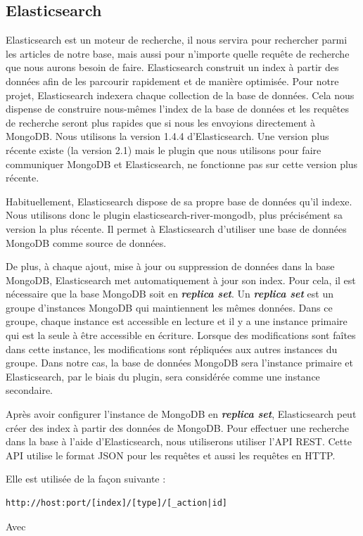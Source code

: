 \subsection{Elasticsearch}
\label{subsec:elastic}

Elasticsearch est un moteur de recherche, il nous servira pour rechercher parmi les articles de notre base, mais aussi pour n'importe quelle requête de recherche que nous aurons besoin de faire. Elasticsearch construit un index à partir des données afin de les parcourir rapidement et de manière optimisée. Pour notre projet, Elasticsearch indexera chaque collection de la base de données. Cela nous dispense de construire nous-mêmes l'index de la base de données et les requêtes de recherche seront plus rapides que si nous les envoyions directement à MongoDB. Nous utilisons la version 1.4.4 d'Elasticsearch. Une version plus récente existe (la version 2.1) mais le plugin que nous utilisons pour faire communiquer MongoDB et Elasticsearch, ne fonctionne pas sur cette version plus récente.


Habituellement, Elasticsearch dispose de sa propre base de données qu’il indexe. Nous utilisons donc le plugin elasticsearch-river-mongodb\cite{GitRiver}, plus précisément sa version la plus récente. Il permet à Elasticsearch d’utiliser une base de données MongoDB comme source de données. 


De plus, à chaque ajout, mise à jour ou suppression de données dans la base MongoDB, Elasticsearch met automatiquement à jour son index. Pour cela, il est nécessaire que la base MongoDB soit en \textbf{\textit{replica set}}.  Un \textbf{\textit{replica set}} est un groupe d’instances MongoDB qui maintiennent les mêmes données. Dans ce groupe, chaque instance est accessible en lecture et il y a une instance primaire qui est la seule à être accessible en écriture. Lorsque des modifications sont faîtes dans cette instance, les modifications sont répliquées aux autres instances du groupe. Dans notre cas, la base de données MongoDB sera l’instance primaire et Elasticsearch, par le biais du plugin, sera considérée comme une instance secondaire. 

Après avoir configurer l'instance de MongoDB en \textbf{\textit{replica set}}, Elasticsearch peut créer des index à partir des données de MongoDB.
Pour effectuer une recherche dans la base à l’aide d’Elasticsearch, nous utiliserons utiliser l’API REST. Cette API utilise le format JSON pour les requêtes et aussi les requêtes en HTTP.


Elle est utilisée de la façon suivante :
\begin{verbatim}
http://host:port/[index]/[type]/[_action|id]
\end{verbatim}
Avec

